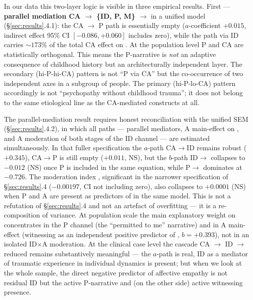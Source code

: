 In our data this two-layer logic is visible in three empirical results. First --- \textbf{parallel mediation CA $\to$ \{ID, P, M\} $\to$ \EAF{}} in a unified model (§\ref{sec:results}.4.1): the CA $\to$ P path is essentially empty ($a$-coefficient $+0.015$, indirect effect 95\% CI $[-0.086, +0.060]$ includes zero), while the path via ID carries $\sim 173\%$ of the total CA effect on \EAF{}. At the population level P and CA are statistically orthogonal. This means the P-narrative is \emph{not} an adaptive consequence of childhood history but an architecturally independent layer. The secondary (hi-P-hi-CA) pattern is not ``P via CA'' but the co-occurrence of two independent axes in a subgroup of people. The primary (hi-P-lo-CA) pattern accordingly is not ``psychopathy without childhood trauma''; it does not belong to the same etiological line as the CA-mediated constructs at all.

The parallel-mediation result requires honest reconciliation with the unified SEM (§\ref{sec:results}.4.2), in which all paths --- parallel mediators, A main-effect on \EAF{}, and A moderation of both stages of the ID channel --- are estimated simultaneously. In that fuller specification the $a$-path CA$\to$ID remains robust ($+0.345$), CA$\to$P is still empty ($+0.011$, NS), but the $b$-path ID$\to$\EAF{} collapses to $-0.012$ (NS) once P is included in the same equation, while P$\to$\EAF{} dominates at $-0.726$. The moderation index \IMM{}, significant in the narrower specification of §\ref{sec:results}.4 ($-0.00197$, CI not including zero), also collapses to $+0.0001$ (NS) when P and A are present as predictors of \EAF{} in the same model. This is not a refutation of §\ref{sec:results}.4 and not an artefact of overfitting --- it is a re-composition of variance. At population scale the main explanatory weight on \EAF{} concentrates in the P channel (the ``permitted to me'' narrative) and in A main-effect (witnessing as an independent positive predictor of \EAF{}, $b = +0.393$), not in an isolated ID$\times$A moderation. At the clinical case level the cascade CA $\to$ ID $\to$ reduced \EAF{} remains substantively meaningful --- the $a$-path is real, ID as a mediator of traumatic experience in individual dynamics is present; but when we look at the whole sample, the direct negative predictor of affective empathy is not residual ID but the active P-narrative and (on the other side) active witnessing presence.

